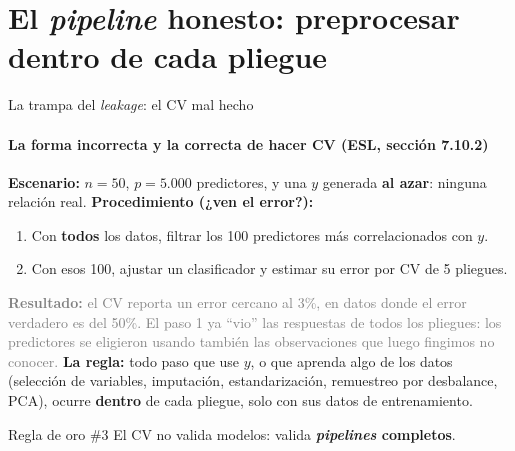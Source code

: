 \documentclass{beamer}
\newcommand{\1}{\mathbb{I}}
\begin{document}
\section{El \emph{pipeline} honesto: preprocesar dentro de cada pliegue}
\begin{frame}[noframenumbering]
\tableofcontents[currentsection]
\end{frame}

\begin{frame}{La trampa del \emph{leakage}: el CV mal hecho}
\framesubtitle{La forma incorrecta y la correcta de hacer CV (ESL, sección 7.10.2)}
\small
\textbf{Escenario:} $n = 50$, $p = 5.000$ predictores, y una $y$ generada \textbf{al azar}: ninguna relación real.
\vspace{0.1cm}
\textbf{Procedimiento (¿ven el error?):}
\begin{enumerate}\itemsep3pt
  \item Con \textbf{todos} los datos, filtrar los 100 predictores más correlacionados con $y$.
  \item Con esos 100, ajustar un clasificador y estimar su error por CV de 5 pliegues.
\end{enumerate}
\pause
\textcolor{gray}{\textbf{Resultado:} el CV reporta un error cercano al 3\%, en datos donde el error verdadero es del 50\%. El paso 1 ya ``vio'' las respuestas de todos los pliegues: los predictores se eligieron usando también las observaciones que luego fingimos no conocer.}
\pause
\vspace{0.1cm}
\textbf{La regla:} todo paso que use $y$, o que aprenda algo de los datos (selección de variables, imputación, estandarización, remuestreo por desbalance, PCA), ocurre \textbf{dentro} de cada pliegue, solo con sus datos de entrenamiento.
\pause
\begin{block}{Regla de oro \#3}
El CV no valida modelos: valida \textbf{\emph{pipelines} completos}.
\end{block}
\end{frame}
\end{document}
